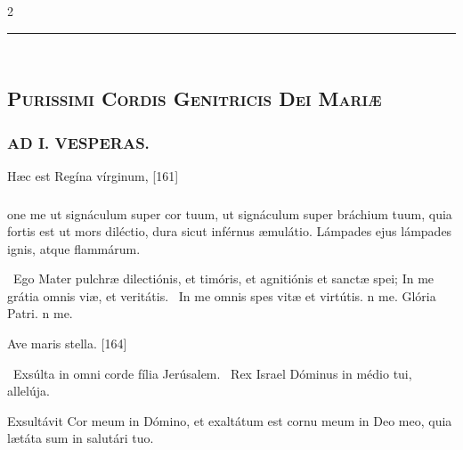 \documentclass[9pt,twoside]{extarticle}
\begin{document}
\begin{multicols}{2}
{\begin{center}\textcolor{red}{\rule{\linewidth}{0.5pt}} \end{center}

\subsection*{\center \textsc{\\
Purissimi Cordis Genitricis Dei Mariæ}}
\subsubsection*{\center {}}

\subsubsection*{\center \textsc{AD I. VESPERAS.}}
\begin{tightlist}{}
\item {} Hæc est Regína vírginum,  [161]
\end{tightlist}
\subsubsection*{}
one me ut signáculum super cor tuum, ut signáculum super bráchium tuum, quia fortis est ut mors diléctio, dura sicut inférnus æmulátio. Lámpades ejus lámpades ignis, atque flammárum.

\begin{tightlist}{}
\item {}~Ego Mater pulchræ dilectiónis, et timóris, et agnitiónis et sanctæ spei; \textred{*} In me grátia omnis viæ, et veritátis. ~In me omnis spes vitæ et virtútis. n me. Glória Patri. n me.
\item {} Ave maris stella. [164]
\item {}~Exsúlta in omni corde fília Jerúsalem. ~Rex Israel Dóminus in médio tui, allelúja.
\item {} Exsultávit Cor meum in Dómino, et exaltátum est cornu meum in Deo meo, quia lætáta sum in salutári tuo.
\end{tightlist}

}
\end{multicols}
\end{document}
